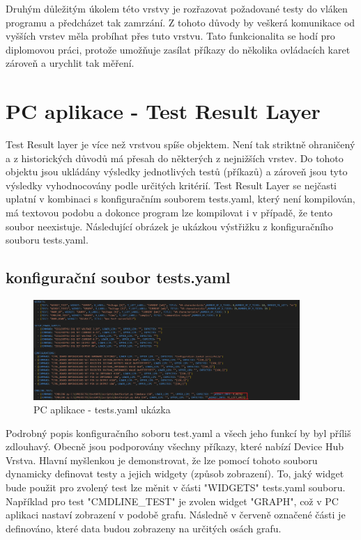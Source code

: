 Druhým důležitým úkolem této vrstvy je rozřazovat požadované testy do vláken programu a předcházet tak zamrzání.
Z tohoto důvody by veškerá komunikace od vyšších vrstev měla probíhat přes tuto vrstvu.
Tato funkcionalita se hodí pro diplomovou práci, protože umožňuje zasílat příkazy do několika ovládacích karet zároveň a
urychlit tak měření.


\section{PC aplikace - Test Result Layer}
Test Result layer je více než vrstvou spíše objektem.
Není tak striktně ohraničený a z historických důvodů má přesah do některých z nejnižších vrstev.
Do tohoto objektu jsou ukládány výsledky jednotlivých testů (příkazů) a zároveň jsou tyto výsledky vyhodnocovány podle
určitých kritérií.
Test Result Layer se nejčasti uplatní v kombinaci s konfiguračním souborem tests.yaml, který není kompilován, má textovou podobu
a dokonce program lze kompilovat i v případě, že tento soubor neexistuje.
Následující obrázek je ukázkou výstřižku z konfiguračního souboru tests.yaml.

\subsection{konfigurační soubor tests.yaml}

\begin{figure}[ht!]
    \centering
    \includegraphics[width = 0.9\textwidth]{obrazky/test_result_class.png}
    \caption{PC aplikace - tests.yaml ukázka}
    \label{fig: tests yaml}
\end{figure}

Podrobný popis konfiguračního soboru test.yaml a všech jeho funkcí by byl příliš zdlouhavý.
Obecně jsou podporovány všechny příkazy, které nabízí Device Hub Vrstva.
Hlavní myšlenkou je demonstrovat, že lze pomocí tohoto souboru dynamicky definovat testy a jejich widgety (způsob zobrazení). 
To, jaký widget bude použit pro zvolený test lze měnit v části "WIDGETS" tests.yaml souboru. Například pro test "CMDLINE\_TEST" je zvolen
widget "GRAPH", což v PC aplikaci nastaví zobrazení v podobě grafu.
Následně v červeně označené části je definováno, které data budou zobrazeny na určitých osách grafu.\\

